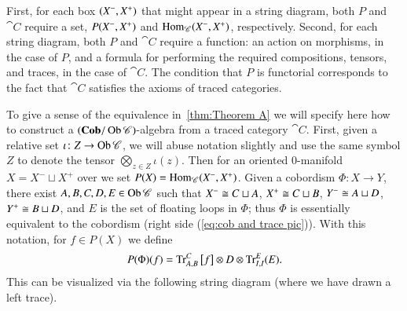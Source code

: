 \documentclass[12pt,oneside,article,draft]{memoir}
\begin{document}
First, for each box $(X^-,X^+)$ that might appear in a string diagram, both $P$ and $\cat{C}$ require a set, $P(X^-,X^+)$ and $\operatorname{Hom}_{\mathscr{C}}(X^-,X^+)$, respectively.
Second, for each string diagram, both $P$ and $\cat{C}$ require a function: an action on morphisms, in the case of $P$, and a formula for performing the required compositions, tensors, and traces, in the case of $\cat{C}$.
The condition that $P$ is functorial corresponds to the fact that $\cat{C}$ satisfies the axioms of traced categories. 

To give a sense of the equivalence in~\ref{thm:Theorem A} we will specify here how to construct a $(\mathbf{Cob}/\operatorname{Ob}\mathscr{C})$-algebra from a traced category $\cat{C}$.
First, given a relative set $\iota\colon Z\to\operatorname{Ob}\mathscr{C}$, we will abuse notation slightly and use the same symbol $Z$ to denote the tensor $\bigotimes_{z\in Z}\iota(z)$.
Then for an oriented 0-manifold $X=X^-\sqcup X^+$ over we set $P(X)=\operatorname{Hom}_{\mathscr{C}}(X^-,X^+)$.
Given a cobordism $\Phi\colon X\to Y$, there exist $A,B,C,D,E\in\operatorname{Ob}\mathscr{C}$ such that $X^-\cong C\sqcup A$, $X^+\cong C\sqcup B$, $Y^-\cong A\sqcup D$, $Y^+\cong B\sqcup D$, and $E$ is the set of floating loops in $\Phi$; thus $\Phi$ is essentially equivalent to the cobordism (right side (\ref{eq:cob and trace pic})).
With this notation, for $f\in P(X)$ we define 
\begin{equation}\label{eq:cob algebra formula}
	P(\Phi)(f)=\operatorname{Tr}_{A,B}^C\big[f\big]\otimes D\otimes\operatorname{Tr}^E_{I,I}(E).
\end{equation}
This can be visualized via the following string diagram (where we have drawn a left trace).
\end{document}
